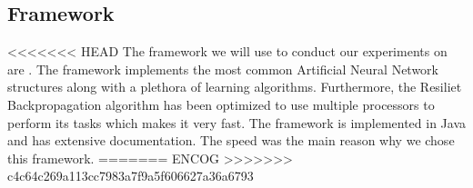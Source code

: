 \subsection{Framework}
<<<<<<< HEAD
The framework we will use to conduct our experiments on are . The framework implements the most common Artificial Neural Network structures along with a plethora of learning algorithms. Furthermore, the Resiliet Backpropagation algorithm has been optimized to use multiple processors to perform its tasks which makes it very fast. The framework is implemented in Java and has extensive documentation. The speed was the main reason why we chose this framework.
=======
ENCOG 
>>>>>>> c4c64c269a113cc7983a7f9a5f606627a36a6793
